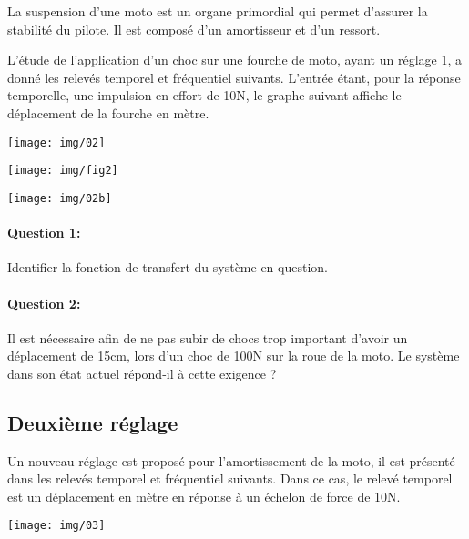 \begin{minipage}{0.58\linewidth}
La suspension d'une moto est un organe primordial qui permet d'assurer la stabilité du pilote. Il est composé d'un amortisseur et d'un ressort.

L'étude de l'application d'un choc sur une fourche de moto, ayant un réglage 1, a donné les relevés temporel et fréquentiel suivants. L'entrée étant, pour la réponse temporelle, une impulsion en effort de 10N, le graphe suivant affiche le déplacement de la fourche en mètre.

\begin{center}
 \texttt{[image: img/02]}
\end{center}

\end{minipage}\hfill
\begin{minipage}{0.38\linewidth}
\begin{center}
 \texttt{[image: img/fig2]}
\end{center}
\end{minipage}

\begin{center}
 \texttt{[image: img/02b]}
\end{center}

\paragraph{Question 1:} Identifier la fonction de transfert du système en question.

\paragraph{Question 2:} Il est nécessaire afin de ne pas subir de chocs trop important d'avoir un déplacement de 15cm, lors d'un choc de 100N sur la roue de la moto. Le système dans son état actuel répond-il à cette exigence ?

\subsection{Deuxième réglage}

Un nouveau réglage est proposé pour l'amortissement de la moto, il est présenté dans les relevés temporel et fréquentiel suivants. Dans ce cas, le relevé temporel est un déplacement en mètre en réponse à un échelon de force de 10N.

\begin{center}
 \texttt{[image: img/03]}
\end{center}

